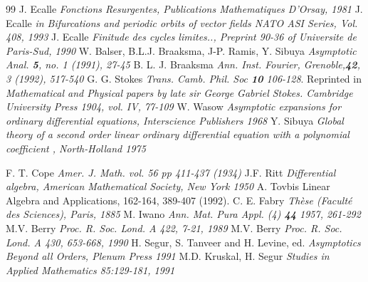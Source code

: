 \documentclass[12pt]{article}
\begin{document}
\begin{thebibliography}{99}
 J. Ecalle {\em Fonctions 
Resurgentes, Publications Mathematiques D'Orsay, 1981}
 J. Ecalle {\em in Bifurcations and periodic orbits of 
vector fields NATO ASI Series, Vol. 408,  1993}
  J. Ecalle {\em Finitude des cycles limites.., Preprint
90-36 of Universite de Paris-Sud, 1990} 
 W. Balser, B.L.J. Braaksma, J-P. Ramis, Y. Sibuya
{\em Asymptotic Anal. {\bf 5}, no. 1 (1991), 27-45}
 B. L. J. Braaksma {\em Ann. Inst. Fourier,
Grenoble,{\bf 42}, 3 (1992), 517-540}
 G. G. Stokes {\em Trans. Camb. Phil. Soc {\bf 10}
106-128}. Reprinted in {\em Mathematical and Physical papers by late
sir George Gabriel Stokes. Cambridge University Press 1904, vol. IV,
77-109}
 W. Wasow {\em  Asymptotic expansions
for ordinary differential equations, Interscience Publishers 1968 }
 Y. Sibuya {\em Global theory of a second order linear
ordinary differential equation with a polynomial coefficient , North-Holland 1975}

 F. T. Cope {\em Amer. J. Math. vol. 56 pp 411-437 (1934)}
 J.F. Ritt   {\em Differential algebra,
 American Mathematical Society, New York 1950}
 A. Tovbis{ Linear
   Algebra and Applications, { 162-164}, 389-407 (1992)}.
 C. E. Fabry {\em Th\`ese (Facult\'e des Sciences), Paris, 1885}
M. Iwano {\em Ann. Mat. Pura Appl. (4) {\bf 44} 1957, 261-292}
 M.V. Berry {\em  Proc. R. Soc. Lond. A 422, 7-21,
1989}
 M.V. Berry {\em  Proc. R. Soc. Lond. A 430, 653-668,
1990}
H. Segur, S.
Tanveer and H. Levine, ed. {\em Asymptotics Beyond all
Orders,  Plenum Press 1991}
 M.D. Kruskal, H. Segur {\em Studies
in Applied Mathematics 85:129-181, 1991}
\end{thebibliography}
\end{document}
